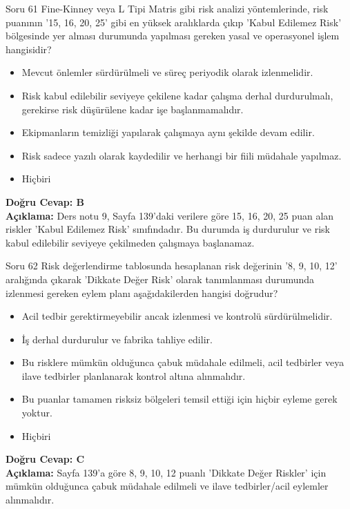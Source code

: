 \documentclass[12pt,a4paper]{article}
\begin{document}
\begin{testcard}{Soru 61}
    Fine-Kinney veya L Tipi Matris gibi risk analizi yöntemlerinde, risk puanının '15, 16, 20, 25' gibi en yüksek aralıklarda çıkıp 'Kabul Edilemez Risk' bölgesinde yer alması durumunda yapılması gereken yasal ve operasyonel işlem hangisidir?
    \begin{itemize}
        \item[A)] Mevcut önlemler sürdürülmeli ve süreç periyodik olarak izlenmelidir.
        \item[B)] Risk kabul edilebilir seviyeye çekilene kadar çalışma derhal durdurulmalı, gerekirse risk düşürülene kadar işe başlanmamalıdır.
        \item[C)] Ekipmanların temizliği yapılarak çalışmaya aynı şekilde devam edilir.
        \item[D)] Risk sadece yazılı olarak kaydedilir ve herhangi bir fiili müdahale yapılmaz.
        \item[E)] Hiçbiri
    \end{itemize}
    \tcblower
    \textbf{Doğru Cevap: B} \\
    \textbf{Açıklama:} Ders notu 9, Sayfa 139'daki verilere göre 15, 16, 20, 25 puan alan riskler 'Kabul Edilemez Risk' sınıfındadır. Bu durumda iş durdurulur ve risk kabul edilebilir seviyeye çekilmeden çalışmaya başlanamaz.
\end{testcard}

\begin{testcard}{Soru 62}
    Risk değerlendirme tablosunda hesaplanan risk değerinin '8, 9, 10, 12' aralığında çıkarak 'Dikkate Değer Risk' olarak tanımlanması durumunda izlenmesi gereken eylem planı aşağıdakilerden hangisi doğrudur?
    \begin{itemize}
        \item[A)] Acil tedbir gerektirmeyebilir ancak izlenmesi ve kontrolü sürdürülmelidir.
        \item[B)] İş derhal durdurulur ve fabrika tahliye edilir.
        \item[C)] Bu risklere mümkün olduğunca çabuk müdahale edilmeli, acil tedbirler veya ilave tedbirler planlanarak kontrol altına alınmalıdır.
        \item[D)] Bu puanlar tamamen risksiz bölgeleri temsil ettiği için hiçbir eyleme gerek yoktur.
        \item[E)] Hiçbiri
    \end{itemize}
    \tcblower
    \textbf{Doğru Cevap: C} \\
    \textbf{Açıklama:} Sayfa 139'a göre 8, 9, 10, 12 puanlı 'Dikkate Değer Riskler' için mümkün olduğunca çabuk müdahale edilmeli ve ilave tedbirler/acil eylemler alınmalıdır.
\end{testcard}
\end{document}
